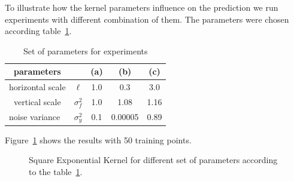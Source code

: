 \documentclass[]{IEEEtran}
\begin{document}
To illustrate how the kernel parameters influence on the prediction we run experiments with different combination of them. The parameters were chosen according table~\ref{parametros}.

\begin{table}[!h]
\centering
\begin{tabular}{|c|c|c|c|c|}
\hline
\textbf{parameters}                  &         & (a)       & (b)       & (c)       \\ \hline
horizontal scale                     & \(\ell\) & 1.0 & 0.3 & 3.0 \\ \hline
vertical scale                       & \({ \sigma  }_{ f }^{ 2 }\) & 1.0 & 1.08 & 1.16 \\ \hline
\multicolumn{1}{|l|}{noise variance} & \({ \sigma  }_{ y }^{ 2 }\) & 0.1 & 0.00005 & 0.89 \\ \hline
\end{tabular}
\caption{Set of parameters for experiments }
\label{parametros}
\end{table}

Figure~\ref{SE_sin_hyper} shows the results with 50 training points.

\begin{figure}[!h]
  \centering
  \hspace{1mm}
  \hspace{1mm}
  \hspace{1mm}
  \caption{Square Exponential Kernel for different set of parameters according to the  table~\ref{parametros}.}
  \label{SE_sin_hyper}
\end{figure}\par
\end{document}
